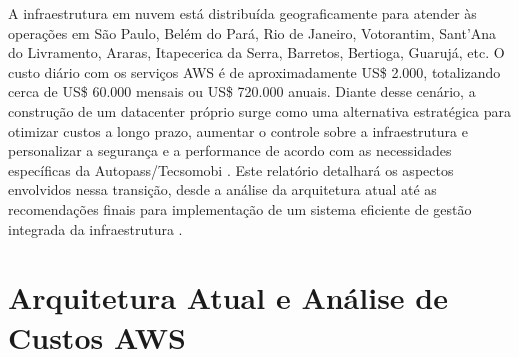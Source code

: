 \documentclass[
	12pt,				%
	oneside,			%
	a4paper,			%
	english,			%
	brazil				%
	]{abntex2unama}
\begin{document}
A infraestrutura em nuvem está distribuída geograficamente para atender às operações em São Paulo, Belém do Pará, Rio de Janeiro, Votorantim, Sant'Ana do Livramento, Araras, Itapecerica da Serra, Barretos, Bertioga, Guarujá, etc. O custo diário com os serviços AWS é de aproximadamente US\$ 2.000, totalizando cerca de US\$ 60.000 mensais ou US\$ 720.000 anuais. Diante desse cenário, a construção de um datacenter próprio surge como uma alternativa estratégica para otimizar custos a longo prazo, aumentar o controle sobre a infraestrutura e personalizar a segurança e a performance de acordo com as necessidades específicas da Autopass/Tecsomobi \cite{datacenter_monitoring} \cite{reliability_engineering}. Este relatório detalhará os aspectos envolvidos nessa transição, desde a análise da arquitetura atual \cite{design_principles} até as recomendações finais para implementação de um sistema eficiente de gestão integrada da infraestrutura \cite{dcim_systems}.

\chapter{Arquitetura Atual e Análise de Custos AWS}
\end{document}
